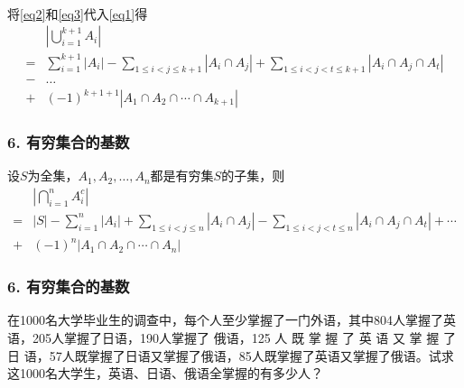\documentclass{beamer}
\begin{document}
\begin{CJK*}{UTF8}{gbsn}
\begin{frame}
\begin{equation}
\begin{split}
    \end{split}
  \end{equation}
\end{frame}
\begin{frame}
将\eqref{eq2}和\eqref{eq3}代入\eqref{eq1}得
  \begin{equation*}
    \begin{split}
    &|\bigcup_{i=1}^{k+1}A_i|\\
=&\sum_{i=1}^{k+1}|A_i| - \sum_{1\leq i < j \leq {k+1}}|A_i \cap A_j| + \sum_{1 \leq  i < j < t \leq {k+1}}|A_i \cap A_j \cap A_t|\\
-&\ldots\\
+&(-1)^{k+1+1}|A_1 \cap A_2 \cap \cdots \cap A_{k+1}|
\end{split}
\end{equation*}
\end{frame}

\begin{frame}
\frametitle{6. 有穷集合的基数}
\begin{Thm}
  设$S$为全集，$A_1, A_2, \ldots, A_n$都是有穷集$S$的子集，则
  \begin{equation*}
    \begin{split}
      &|\bigcap_{i=1}^nA_{i}^c|\\
=&|S| - \sum_{i=1}^n|A_i| + \sum_{1\leq i < j \leq n}|A_i \cap A_j|
-\sum_{1 \leq  i < j < t \leq n}|A_i \cap A_j \cap A_t| + \cdots \\
+&(-1)^n|A_1 \cap A_2 \cap \cdots \cap A_n|
    \end{split}
  \end{equation*}
\end{Thm}
\end{frame}

\begin{frame}
\frametitle{6. 有穷集合的基数}
\begin{Ex}
  在1000名大学毕业生的调查中，每个人至少掌握了一门外语，其中804人掌握了英语，205人掌握了日语，190人掌握了 俄语，125  人 既 掌 握 了 英 语 又 掌 握 了 日 语，57人既掌握了日语又掌握了俄语，85人既掌握了英语又掌握了俄语。试求这1000名大学生，英语、日语、俄语全掌握的有多少人？
\end{Ex}
\end{frame}

\end{CJK*}
\end{document}
